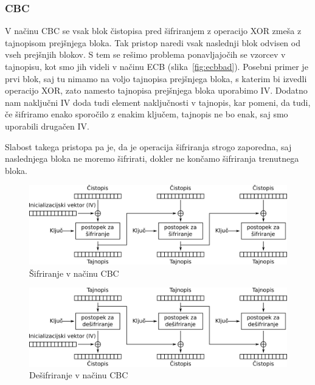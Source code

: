 \documentclass[12pt,a4paper,openany,tikz]{book}
\theoremstyle{plain}
\theoremstyle{definition}
\begin{document}
\subsubsection{CBC}
\label{subs:CBC}

V načinu \Gls{CBC} se vsak blok čistopisa pred šifriranjem z operacijo \rm{XOR} zmeša z tajnopisom prejšnjega bloka. Tak pristop naredi vsak naslednji blok odvisen od vseh prejšnjih blokov. S tem se rešimo problema ponavljajočih se vzorcev v tajnopisu, kot smo jih videli v načinu \acrshort{ECB} (slika~\ref{fig:ecbbad}). Posebni primer je prvi blok, saj tu nimamo na voljo tajnopisa prejšnjega bloka, s katerim bi izvedli operacijo \rm{XOR}, zato namesto tajnopisa prejšnjega bloka uporabimo \acrfull{IV}. Dodatno nam naključni \gls{IV} doda tudi element naključnosti v tajnopis, kar pomeni, da tudi, če šifriramo enako sporočilo z enakim ključem, tajnopis ne bo enak, saj smo uporabili drugačen \gls{IV}.

Slabost takega pristopa pa je, da je operacija šifriranja strogo zaporedna, saj naslednjega bloka ne moremo šifrirati, dokler ne končamo šifriranja trenutnega bloka.

\begin{figure}[ht!]
  \centering
    \includegraphics[width=\textwidth]{images/CBC_encryption}
    \caption{Šifriranje v načinu \gls{CBC}}
\label{fig:cbcenc}
\end{figure}

\begin{figure}[ht!]
  \centering
    \includegraphics[width=\textwidth]{images/CBC_decryption}
    \caption{Dešifriranje v načinu \gls{CBC}}
\label{fig:cbcdec}
\end{figure}
\end{document}
